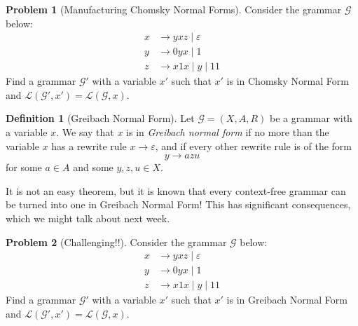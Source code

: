 \documentclass[11pt]{article}
\theoremstyle{definition} %
\newtheorem{definition}     [theorem]   {{\color{NavyBlue}Definition}}
\newtheorem{problem}                    {{\color{BurntOrange}Problem}}
\theoremstyle{remark} %
\begin{document}
\begin{problem}[Manufacturing Chomsky Normal Forms]
    Consider the grammar \(\mathcal G\) below: 
    \[\begin{aligned}
        x &\to yxz \mid \varepsilon \\
        y &\to 0yx \mid 1  \\
        z &\to x1x \mid y \mid 11
    \end{aligned}\]
    Find a grammar \(\mathcal G'\) with a variable \(x'\) such that \(x'\) is in Chomsky Normal Form and \(\mathcal L(\mathcal G', x') = \mathcal L(\mathcal G, x)\).
\end{problem}

\pagebreak

\begin{definition}[Greibach Normal Form]
    Let \(\mathcal G = (X, A, R)\) be a grammar with a variable \(x\).
    We say that \(x\) is in \emph{Greibach normal form} if no more than the variable \(x\) has a rewrite rule \(x \to \varepsilon\), and if every other rewrite rule is of the form 
    \[
        y \to azu
    \]
    for some \(a \in A\) and some \(y,z,u \in X\).
\end{definition}

It is not an easy theorem, but it is known that every context-free grammar can be turned into one in Greibach Normal Form!
This has significant consequences, which we might talk about next week.

\begin{problem}[Challenging!!]
    Consider the grammar \(\mathcal G\) below: 
    \[\begin{aligned}
        x &\to yxz \mid \varepsilon \\
        y &\to 0yx \mid 1  \\
        z &\to x1x \mid y \mid 11
    \end{aligned}\]
    Find a grammar \(\mathcal G'\) with a variable \(x'\) such that \(x'\) is in Greibach Normal Form and \(\mathcal L(\mathcal G', x') = \mathcal L(\mathcal G, x)\).
\end{problem}
\end{document}
